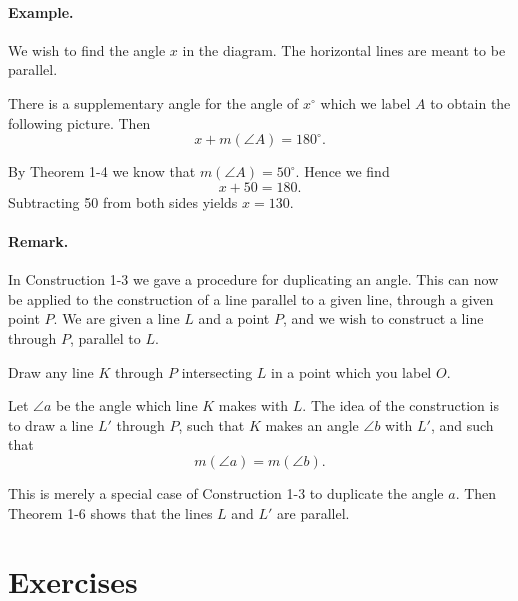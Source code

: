 \documentclass[12pt]{book} %
\begin{document}
\paragraph{Example.}
We wish to find the angle $x$ in the diagram. The horizontal lines are meant to be parallel.


There is a supplementary angle for the angle of $x^\circ$ which we label $A$ to obtain the following picture. Then
\[
x+m(\angle A)=180^\circ.
\]


By Theorem 1-4 we know that $m(\angle A)=50^\circ$. Hence we find
\[
x+50=180.
\]
Subtracting 50 from both sides yields $x=130$.

\paragraph{Remark.}
In Construction 1-3 we gave a procedure for duplicating an angle. This can now be applied to the construction of a line parallel to a given line, through a given point $P$. We are given a line $L$ and a point $P$, and we wish to construct a line through $P$, parallel to $L$.

Draw any line $K$ through $P$ intersecting $L$ in a point which you label $O$.


Let $\angle a$ be the angle which line $K$ makes with $L$. The idea of the construction is to draw a line $L'$ through $P$, such that $K$ makes an angle $\angle b$ with $L'$, and such that
\[
m(\angle a)=m(\angle b).
\]


This is merely a special case of Construction 1-3 to duplicate the angle $a$. Then Theorem 1-6 shows that the lines $L$ and $L'$ are parallel.

\section*{Exercises}
\end{document}
